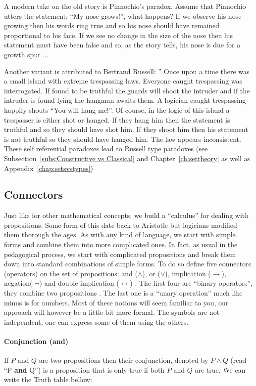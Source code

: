 A modern  take  on the old story is Pinnochio's paradox. Assume that Pinnochio utters the statement: ``My nose grows!'', what happens? If we observe his nose growing then his words ring true and so his nose should have remained proportional to his face. If we see no change in the size of the nose then his statement must have been false and so, as the story tells, his nose is due for a growth spur ...  

Another variant is attributed to Bertrand Russell:
'' Once upon a time there was a small island with extreme trespassing laws. Everyone caught trespassing was interrogated.  If   found to be truthful the guards  will shoot the intruder and if the intruder is found lying the  hangman awaits  them. A logician caught trespassing happily shouts ``You will hang me!''. Of course, in the logic of this island a trespasser  is either shot or hanged. If they hang him then the statement is truthful and so they should have  shot him. If they shoot him then his statement is not truthful so they should have hanged him. The law appears  inconsistent.
These  self referential paradoxes  lead to Russell type paradoxes (see Subsection~\ref{subs:Constructive vs Classical} and 
 Chapter~\ref{ch:settheory} as well as Appendix~\ref{chap:setsvstypes})


  \subsection{Connectors}
Just like for other mathematical concepts, we build a ``calculus'' for dealing with  propositions. Some form of this date back to Aristotle but logicians  modified them thorough the ages. As with any kind of language, we start with simple forms and combine them into more complicated ones. In fact, as usual in the  pedagogical process,  we start with complicated propositions and break them down into  standard combinations of simple forms. To do so define five connectors (operators) on the set of propositions: and ($\land$), or ($\lor$),  implication ($\rightarrow$),   negation( $\neg$) and  double implication ($\leftrightarrow$) . The first four are  ``binary operators'', they combine two propositions . The last one is a ``unary operation''  much like minus is for numbers. Most of these notions will seem familiar to you, our approach will however be a little bit more formal. The symbols are not independent, one can express some of them using the others.

\paragraph{\bf Conjunction (and)}
If $P$ and $Q$ are two propositions then their conjunction, denoted by $P\land Q$  (read ``P {\bf and} Q'') is a proposition that is only true if both $P$ and $Q$ are true. We can write the Truth table bellow:

